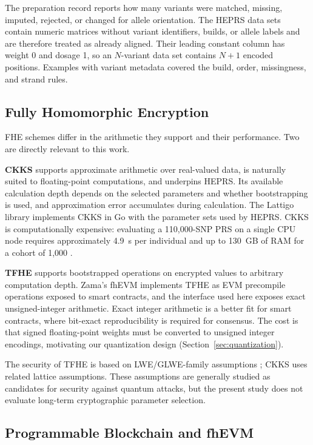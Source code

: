 \documentclass[10pt]{article}
\begin{document}
The preparation record reports how many variants were matched, missing, imputed,
rejected, or changed for allele orientation.  The HEPRS data sets contain
numeric matrices without variant identifiers, builds, or allele labels and are therefore
treated as already aligned.  Their leading constant column has weight 0 and dosage 1,
so an $N$-variant data set contains $N+1$ encoded positions.  Examples with variant
metadata covered the build, order, missingness, and strand rules.

\subsection{Fully Homomorphic Encryption}

FHE schemes differ in the arithmetic they support and their performance.  Two are
directly relevant to this work.

\textbf{CKKS} \citep{cheon2017ckks} supports approximate arithmetic over real-valued data, is
naturally suited to floating-point computations, and underpins HEPRS.  Its available
calculation depth depends on the selected parameters and whether bootstrapping is used,
and approximation error accumulates during calculation.  The Lattigo library
\citep{lattigo} implements CKKS in Go with the parameter sets used
by HEPRS.  CKKS is computationally expensive: evaluating a 110,000-SNP PRS on a
single CPU node requires approximately 4.9~s per individual and up to 130~GB of RAM
for a cohort of 1,000 \citep{knight2026heprs}.

\textbf{TFHE} \citep{chillotti2020tfhe} supports bootstrapped operations on encrypted
values to arbitrary computation depth.  Zama's fhEVM implements TFHE as EVM precompile
operations exposed to smart contracts, and the interface used here exposes exact
unsigned-integer arithmetic.  Exact integer arithmetic is a better fit for smart
contracts, where bit-exact reproducibility is required for consensus.  The cost is that
signed floating-point weights must be converted to unsigned integer encodings,
motivating our quantization design (Section~\ref{sec:quantization}).

The security of TFHE is based on LWE/GLWE-family assumptions
\citep{chillotti2020tfhe}; CKKS uses related lattice assumptions.  These assumptions
are generally studied as candidates for security against quantum attacks, but the
present study does not evaluate long-term cryptographic parameter selection.

\subsection{Programmable Blockchain and fhEVM}
\end{document}
